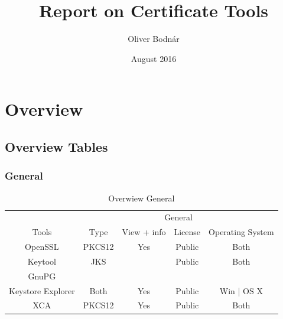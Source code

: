 \documentclass[10pt, a4paper]{report}
\title{Report on Certificate Tools}
\author{Oliver Bodnár}
\date{August 2016}
\begin{document}
\maketitle

\tableofcontents

\newpage

\part{Overview}

\chapter{Overview Tables}

\section{General}
\begin{table}[h!]
\centering
\caption{Overwiew General}
\label{my-label}
\begin{adjustbox}{max width=\textwidth}
\begin{tabular}{|c|c|c|c|c|}
\hline
                        & \multicolumn{4}{c|}{General}                                                                               \\ \cline{2-5} 
\multirow{-2}{*}{Tools} & Type   & View + info                                        & License & Operating System                   \\ \hline
OpenSSL                 & PKCS12 & \cellcolor[HTML]{34FF34}Yes                        & Public  & \cellcolor[HTML]{34FF34}Both       \\ \hline
Keytool                 & JKS    & \cellcolor[HTML]{34FF34}{\color[HTML]{000000} Yes} & Public  & \cellcolor[HTML]{34FF34}Both       \\ \hline
GnuPG                   &        &                                                    &         &                                    \\ \hline
Keystore Explorer       & Both   & \cellcolor[HTML]{34FF34}Yes                        & Public  & \cellcolor[HTML]{FFC702}Win | OS X \\ \hline
XCA                     & PKCS12 & \cellcolor[HTML]{34FF34}Yes                        & Public  & \cellcolor[HTML]{34FF34}Both       \\ \hline
\end{tabular}
\end{adjustbox}
\end{table}
\end{document}
